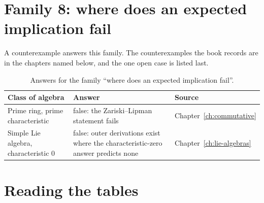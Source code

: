 \section{Family 8: where does an expected implication fail}

A counterexample answers this family. %
The counterexamples the book records are in the chapters named below, and the %
one open case is listed last. %

\begin{table}[htbp]
  \centering
  \caption{Answers for the family ``where does an expected implication
  fail''.} %
  \label{tab:q:counterexamples}
  \begin{tabular}{p{}p{}p{}}
    \toprule
    Class of algebra & Answer & Source \\ %
    \midrule
    Prime ring, prime characteristic & false: the Zariski--Lipman %
      statement fails & Chapter~\ref{ch:commutative} \\ %
    Simple Lie algebra, characteristic $0$ & false: outer derivations exist %
      where the characteristic-zero answer predicts none & %
      Chapter~\ref{ch:lie-algebras} \\ %
    \bottomrule
  \end{tabular}
\end{table}

\section{Reading the tables}

